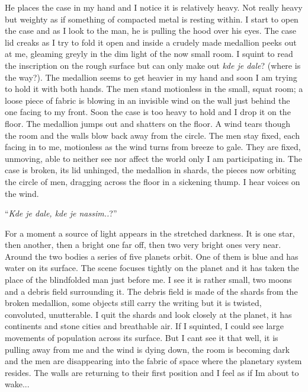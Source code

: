 He places the case in my hand and I notice it is relatively heavy. Not
really heavy but weighty as if something of compacted metal is resting
within. I start to open the case and as I look to the man, he is pulling
the hood over his eyes. The case lid creaks as I try to fold it open and
inside a crudely made medallion peeks out at me, gleaming greyly in the
dim light of the now small room. I squint to read the inscription on the
rough surface but can only make out \textquotesingle{}\emph{kde je
dale}?\textquotesingle{} (where is the way?). The medallion seems to get
heavier in my hand and soon I am trying to hold it with both hands. The
men stand motionless in the small, squat room; a loose piece of fabric
is blowing in an invisible wind on the wall just behind the one facing
to my front. Soon the case is too heavy to hold and I drop it on the
floor. The medallion jumps out and shatters on the floor. A wind tears
though the room and the walls blow back away from the circle. The men
stay fixed, each facing in to me, motionless as the wind turns from
breeze to gale. They are fixed, unmoving, able to neither see nor affect
the world only I am participating in. The case is broken, its lid
unhinged, the medallion in shards, the pieces now orbiting the circle of
men, dragging across the floor in a sickening thump. I hear voices on
the wind.

``\emph{Kde je dale, kde je nassim..}?''

For a moment a source of light appears in the stretched darkness. It is
one star, then another, then a bright one far off, then two very bright
ones very near. Around the two bodies a series of five planets orbit.
One of them is blue and has water on its surface. The scene focuses
tightly on the planet and it has taken the place of the blindfolded man
just before me. I see it is rather small, two moons and a debris field
surrounding it. The debris field is made of the shards from the broken
medallion, some objects still carry the writing but it is twisted,
convoluted, unutterable. I quit the shards and look closely at the
planet, it has continents and stone cities and breathable air. If I
squinted, I could see large movements of population across its surface.
But I can\textquotesingle t see it that well, it is pulling away from me
and the wind is dying down, the room is becoming dark and the men are
disappearing into the fabric of space where the planetary system
resides. The walls are returning to their first position and I feel as
if I\textquotesingle m about to wake...

